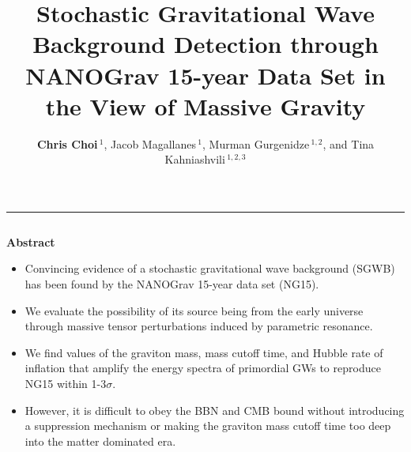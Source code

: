 \documentclass{beamer}                             %
\title[]{\Huge Stochastic Gravitational Wave Background Detection through \\ NANOGrav 15-year Data Set in the View of Massive Gravity}
\author[Choi]{\LARGE \textbf{Chris Choi$\,^1$}, Jacob Magallanes$\,^1$, Murman Gurgenidze$\,^{1,2}$, and Tina Kahniashvili$\,^{1,2,3}$}
\institute[]{\large $\,^1$Carnegie Mellon University, $\,^2$Ilia State University, $\,^3$Abastumani Astrophysical Observatory}
\date[]{}
\newcommand{\blocktitle}[1]{{\Large \textbf{#1}}}
\begin{document}
\begin{frame}[t]
\vspace{-1em}
\titlepage



\vspace{-6cm}

\begin{center}
  \textcolor{darksilver}{\rule{\textwidth}{2mm}}
\end{center}

\begin{columns}[T]


\begin{column}{0.30\textwidth}
  \begin{tcolorbox}
    \blocktitle{Abstract}
    \begin{itemize}
        \item Convincing evidence of a stochastic gravitational wave background (SGWB) has been found by the NANOGrav 15-year data set (NG15). 
        \item We evaluate the possibility of its source being from the early universe through massive tensor perturbations induced by parametric resonance. 
        \item We find values of the graviton mass, mass cutoff time, and Hubble rate of inflation that amplify the energy spectra of primordial GWs to reproduce NG15 within 1-3$\sigma$. 
        \item However, it is difficult to obey the BBN and CMB bound without introducing a suppression mechanism or making the graviton mass cutoff time too deep into the matter dominated era.
    \end{itemize}
  \end{tcolorbox}


\end{column}
\end{columns}
\end{frame}
\end{document}
